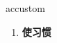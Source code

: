 
\begin{frame}
{\huge accustom}
\begin{center}
\begin{enumerate}\Large
  \item \textbf{使习惯}
\end{enumerate}
\end{center}
\end{frame}
